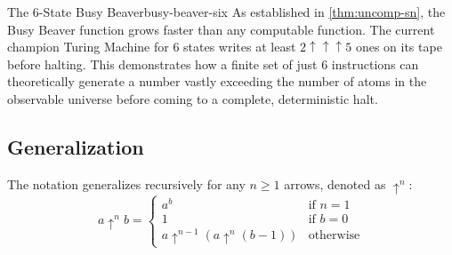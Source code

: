 \begin{observation}{The 6-State Busy Beaver}{busy-beaver-six}
    As established in \cref{thm:uncomp-sn}, the Busy Beaver function grows faster than any computable function. The current champion Turing Machine for 6 states writes at least \(2 \uparrow\uparrow\uparrow 5\) ones on its tape before halting. This demonstrates how a finite set of just 6 instructions can theoretically generate a number vastly exceeding the number of atoms in the observable universe before coming to a complete, deterministic halt.
\end{observation}

\subsection*{Generalization}
The notation generalizes recursively for any \(n \ge 1\) arrows, denoted as \(\uparrow^n\):
\[
    a \uparrow^n b = 
    \begin{cases} 
        a^b & \text{if } n = 1 \\
        1 & \text{if } b = 0 \\
        a \uparrow^{n-1} (a \uparrow^n (b-1)) & \text{otherwise}
    \end{cases}
\]